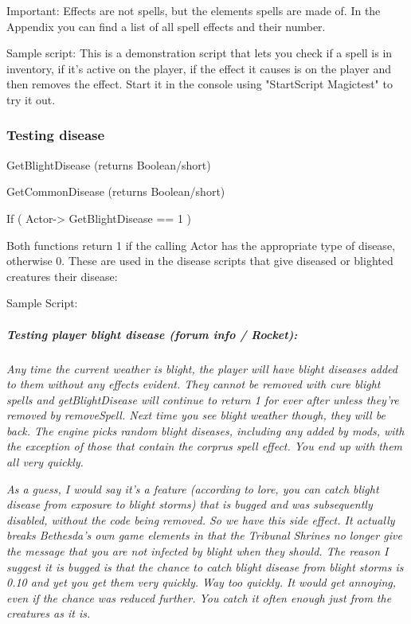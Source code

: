 Important: Effects are not spells, but the elements spells are made of.
In the Appendix you can find a list of all spell effects and their
number.

Sample script: This is a demonstration script that lets you check if a
spell is in inventory, if it's active on the player, if the effect it
causes is on the player and then removes the effect. Start it in the
console using "StartScript Magictest" to try it out.



\hypertarget{testing-disease}{%
\subsubsection{Testing disease}\label{testing-disease}}

GetBlightDisease (returns Boolean/short)

GetCommonDisease (returns Boolean/short)

If ( Actor-> GetBlightDisease == 1 )

Both functions return 1 if the calling Actor has the appropriate type of
disease, otherwise 0. These are used in the disease scripts that give
diseased or blighted creatures their disease:

Sample Script:



\hypertarget{testing-player-blight-disease-forum-info-rocket}{%
\subparagraph{Testing player blight disease (forum info /
Rocket):}\label{testing-player-blight-disease-forum-info-rocket}}

\emph{Any time the current weather is blight, the player will have
blight diseases added to them without any effects evident. They cannot
be removed with cure blight spells and getBlightDisease will continue to
return 1 for ever after unless they're removed by removeSpell. Next time
you see blight weather though, they will be back. The engine picks
random blight diseases, including any added by mods, with the exception
of those that contain the corprus spell effect. You end up with them all
very quickly.}

\emph{As a guess, I would say it's a feature (according to lore, you can
catch blight disease from exposure to blight storms) that is bugged and
was subsequently disabled, without the code being removed. So we have
this side effect. It actually breaks Bethesda's own game elements in
that the Tribunal Shrines no longer give the message that you are not
infected by blight when they should. The reason I suggest it is bugged
is that the chance to catch blight disease from blight storms is 0.10
and yet you get them very quickly. Way too quickly. It would get
annoying, even if the chance was reduced further. You catch it often
enough just from the creatures as it is.}

